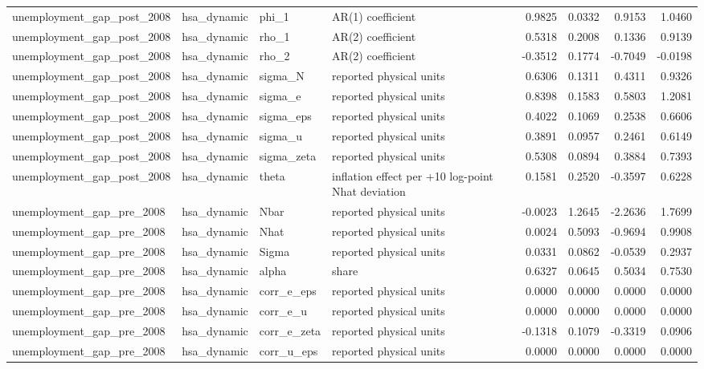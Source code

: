 \begin{tabular}{llllrrrr}
unemployment\_gap\_post\_2008 & hsa\_dynamic & phi\_1 & AR(1) coefficient & 0.9825 & 0.0332 & 0.9153 & 1.0460 \\
unemployment\_gap\_post\_2008 & hsa\_dynamic & rho\_1 & AR(2) coefficient & 0.5318 & 0.2008 & 0.1336 & 0.9139 \\
unemployment\_gap\_post\_2008 & hsa\_dynamic & rho\_2 & AR(2) coefficient & -0.3512 & 0.1774 & -0.7049 & -0.0198 \\
unemployment\_gap\_post\_2008 & hsa\_dynamic & sigma\_N & reported physical units & 0.6306 & 0.1311 & 0.4311 & 0.9326 \\
unemployment\_gap\_post\_2008 & hsa\_dynamic & sigma\_e & reported physical units & 0.8398 & 0.1583 & 0.5803 & 1.2081 \\
unemployment\_gap\_post\_2008 & hsa\_dynamic & sigma\_eps & reported physical units & 0.4022 & 0.1069 & 0.2538 & 0.6606 \\
unemployment\_gap\_post\_2008 & hsa\_dynamic & sigma\_u & reported physical units & 0.3891 & 0.0957 & 0.2461 & 0.6149 \\
unemployment\_gap\_post\_2008 & hsa\_dynamic & sigma\_zeta & reported physical units & 0.5308 & 0.0894 & 0.3884 & 0.7393 \\
unemployment\_gap\_post\_2008 & hsa\_dynamic & theta & inflation effect per +10 log-point Nhat deviation & 0.1581 & 0.2520 & -0.3597 & 0.6228 \\
unemployment\_gap\_pre\_2008 & hsa\_dynamic & Nbar & reported physical units & -0.0023 & 1.2645 & -2.2636 & 1.7699 \\
unemployment\_gap\_pre\_2008 & hsa\_dynamic & Nhat & reported physical units & 0.0024 & 0.5093 & -0.9694 & 0.9908 \\
unemployment\_gap\_pre\_2008 & hsa\_dynamic & Sigma & reported physical units & 0.0331 & 0.0862 & -0.0539 & 0.2937 \\
unemployment\_gap\_pre\_2008 & hsa\_dynamic & alpha & share & 0.6327 & 0.0645 & 0.5034 & 0.7530 \\
unemployment\_gap\_pre\_2008 & hsa\_dynamic & corr\_e\_eps & reported physical units & 0.0000 & 0.0000 & 0.0000 & 0.0000 \\
unemployment\_gap\_pre\_2008 & hsa\_dynamic & corr\_e\_u & reported physical units & 0.0000 & 0.0000 & 0.0000 & 0.0000 \\
unemployment\_gap\_pre\_2008 & hsa\_dynamic & corr\_e\_zeta & reported physical units & -0.1318 & 0.1079 & -0.3319 & 0.0906 \\
unemployment\_gap\_pre\_2008 & hsa\_dynamic & corr\_u\_eps & reported physical units & 0.0000 & 0.0000 & 0.0000 & 0.0000 \\

\end{tabular}
